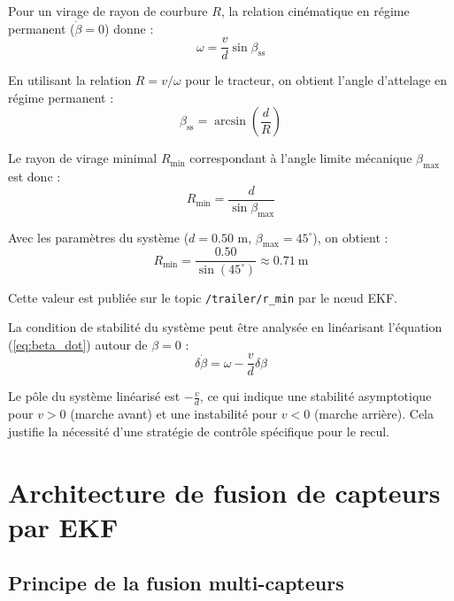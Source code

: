 \documentclass[a4paper,12pt]{report}
\begin{document}
Pour un virage de rayon de courbure $R$, la relation cinématique en régime permanent ($\dot{\beta} = 0$) donne :
\begin{equation}
    \omega = \frac{v}{d} \sin\beta_{\text{ss}}
    \label{eq:regime_permanent}
\end{equation}

En utilisant la relation $R = v/\omega$ pour le tracteur, on obtient l'angle d'attelage en régime permanent :
\begin{equation}
    \beta_{\text{ss}} = \arcsin\left(\frac{d}{R}\right)
    \label{eq:beta_steady_state}
\end{equation}

Le rayon de virage minimal $R_{\min}$ correspondant à l'angle limite mécanique $\beta_{\max}$ est donc :
\begin{equation}
    R_{\min} = \frac{d}{\sin\beta_{\max}}
    \label{eq:rayon_minimal}
\end{equation}

Avec les paramètres du système ($d = 0.50$ m, $\beta_{\max} = 45^\circ$), on obtient :
\begin{equation}
    R_{\min} = \frac{0.50}{\sin(45^\circ)} \approx 0.71~\text{m}
    \label{eq:rayon_minimal_calcule}
\end{equation}

Cette valeur est publiée sur le topic \texttt{/trailer/r\_min} par le nœud EKF.

La condition de stabilité du système peut être analysée en linéarisant l'équation (\ref{eq:beta_dot}) autour de $\beta = 0$ :
\begin{equation}
    \delta\dot{\beta} = \omega - \frac{v}{d} \delta\beta
    \label{eq:linearisation_beta}
\end{equation}

Le pôle du système linéarisé est $-\frac{v}{d}$, ce qui indique une stabilité asymptotique pour $v > 0$ (marche avant) et une instabilité pour $v < 0$ (marche arrière). Cela justifie la nécessité d'une stratégie de contrôle spécifique pour le recul.

\section{Architecture de fusion de capteurs par EKF}
\label{sec:architecture_ekf}

\subsection{Principe de la fusion multi-capteurs}
\label{subsec:principe_fusion}
\end{document}
